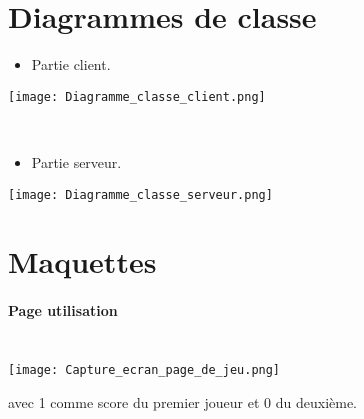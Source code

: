\documentclass[a4paper,oneside]{article}
\begin{document}
 	\section{Diagrammes de classe}
 	\begin{itemize}
 		\item Partie client.
 		\end{itemize}
 		\texttt{[image: Diagramme\_classe\_client.png]}
 		
	 ~\\
 		 	\begin{itemize}
 		 		\item Partie serveur.
 		 	\end{itemize}
 		 	\texttt{[image: Diagramme\_classe\_serveur.png]}
 		 		
 	
 	\section{Maquettes}
 	
 	\paragraph{Page utilisation}
 	~\\
 	\texttt{[image: Capture\_ecran\_page\_de\_jeu.png]}
 	~\\
 
 	\begin{center}
 		avec 1 comme score du  premier joueur et 0 du deuxième.
 		
 	\end{center} 	
 	
 	\label{fin}
 
\end{document}
